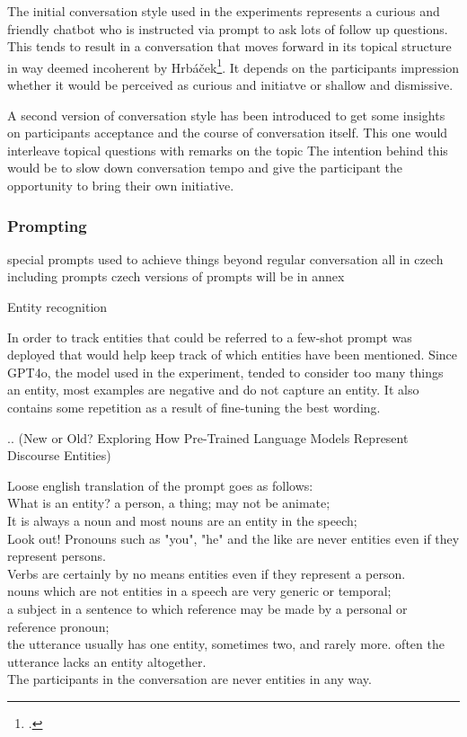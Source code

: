 \documentclass[12pt]{report}
\begin{document}
{\par
The initial conversation style used in the experiments
represents a curious and friendly chatbot
who is instructed via prompt to ask lots of follow up questions.
This tends to result in a conversation that moves forward in its topical structure
in way deemed incoherent by Hrbáček\footcite[p.~30]{hrbacek1994}.
It depends on the participants impression whether it would be perceived as
curious and initiatve or shallow and dismissive.

\par
A second version of conversation style has been introduced
to get some insights on participants acceptance and
the course of conversation itself.
This one would interleave topical questions with remarks on the topic
The intention behind this would be to slow down conversation tempo
and give the participant the opportunity to bring their own initiative.

\subsubsection{Prompting}

special prompts used to achieve things beyond regular conversation
all in czech including prompts
czech versions of prompts will be in annex

\par
Entity recognition

In order to track entities that could be referred to
a few-shot prompt was deployed that would help
keep track of which entities have been mentioned.
Since GPT4o, the model used in the experiment,
tended to consider too many things an entity,
most examples are negative and do not capture an entity.
It also contains some repetition as a result of fine-tuning the best wording.

..
(New or Old? Exploring How Pre-Trained Language Models Represent Discourse Entities)

Loose english translation of the prompt goes as follows:\\
\linespread{1.5}
{\tiny
What is an entity? a person, a thing; may not be animate;\\
 It is always a noun and most nouns are an entity in the speech;\\
 Look out! Pronouns such as "you", "he" and the like are never entities even if they represent persons.\\
 Verbs are certainly by no means entities even if they represent a person.\\
 nouns which are not entities in a speech are very generic or temporal;\\
 a subject in a sentence to which reference may be made by a personal or reference pronoun;\\
 the utterance usually has one entity, sometimes two, and rarely more. often the utterance lacks an entity altogether.\\
 The participants in the conversation are never entities in any way.\\

}}
\end{document}
